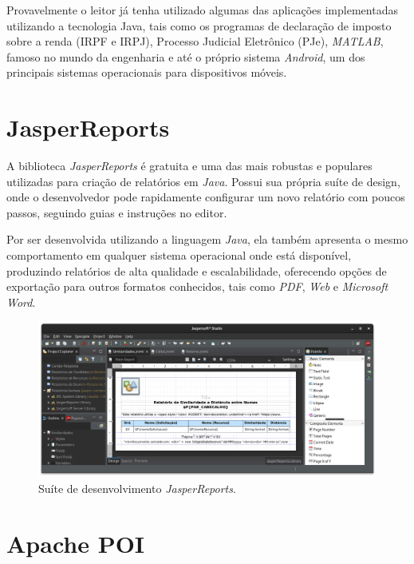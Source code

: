 \documentclass[
	12pt,			%
	openright,		%
	oneside,	
	a4paper,		%
	english,		%
	brazil			%
]{abntex2/abntex2}  %
\begin{document}
	Provavelmente o leitor já tenha utilizado algumas das aplicações implementadas utilizando a tecnologia Java, tais como os programas de declaração de imposto sobre a renda (IRPF e IRPJ), Processo Judicial Eletrônico (PJe), \textit{MATLAB}, famoso no mundo da engenharia e até o próprio sistema \textit{Android}, um dos principais sistemas operacionais para dispositivos móveis.
	
	\section{JasperReports\textregistered}
	
	A biblioteca \textit{JasperReports\textregistered} \cite{jasper} é gratuita e uma das mais robustas e populares utilizadas para criação de relatórios em \textit{Java}. Possui sua própria suíte de design, onde o desenvolvedor pode rapidamente configurar um novo relatório com poucos passos, seguindo guias e instruções no editor.
	
	Por ser desenvolvida utilizando a linguagem \textit{Java}, ela também apresenta o mesmo comportamento em qualquer sistema operacional onde está disponível, produzindo relatórios de alta qualidade e escalabilidade, oferecendo opções de exportação para outros formatos conhecidos, tais como \textit{PDF}, \textit{Web} e \textit{Microsoft Word}.
	
	\begin{figure}[H]
		\caption{\label{jasper-reports}Suíte de desenvolvimento \textit{JasperReports\textregistered}.}
		\begin{center}
			\includegraphics[scale=0.35]{img/jaspersoft}
		\end{center}
	\end{figure}

	\section{Apache POI}
	
\end{document}
